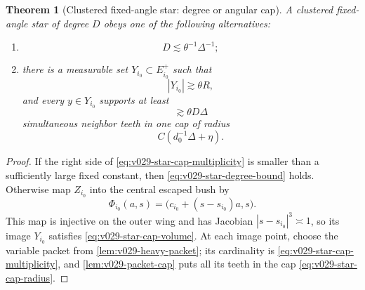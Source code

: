 \documentclass[10pt]{article}
\newtheorem{theorem}{Theorem}[section]
\begin{document}
\begin{theorem}[Clustered fixed-angle star: degree or angular cap]
\label{thm:v029-star-cap}
A clustered fixed-angle star of degree \(D\) obeys one of the following alternatives:
\begin{enumerate}[label=\textnormal{(\roman*)}]
\item
\begin{equation}
\label{eq:v029-star-degree-bound}
\boxed{
D
\lesssim
\theta^{-1}\Delta^{-1};
}
\end{equation}
\item there is a measurable set \(Y_{i_0}\subset E_{i_0}^+\) such that
\begin{equation}
\label{eq:v029-star-cap-volume}
\boxed{
|Y_{i_0}|
\gtrsim
\theta R,
}
\end{equation}
and every \(y\in Y_{i_0}\) supports at least
\begin{equation}
\label{eq:v029-star-cap-multiplicity}
\boxed{
\gtrsim
\theta D\Delta
}
\end{equation}
simultaneous neighbor teeth in one cap of radius
\begin{equation}
\label{eq:v029-star-cap-radius}
\boxed{
C(d_0^{-1}\Delta+\eta).
}
\end{equation}
\end{enumerate}
\end{theorem}

\begin{proof}
If the right side of
\eqref{eq:v029-star-cap-multiplicity} is smaller than a sufficiently large fixed constant, then
\eqref{eq:v029-star-degree-bound} holds.  Otherwise map \(Z_{i_0}\) into the central escaped bush by
\[
\Phi_{i_0}(a,s)
=
\bigl(c_{i_0}+(s-s_{i_0})a,s\bigr).
\]
This map is injective on the outer wing and has Jacobian \(|s-s_{i_0}|^3\asymp1\), so its image
\(Y_{i_0}\) satisfies
\eqref{eq:v029-star-cap-volume}.  At each image point, choose the variable packet from
\cref{lem:v029-heavy-packet}; its cardinality is
\eqref{eq:v029-star-cap-multiplicity}, and
\cref{lem:v029-packet-cap} puts all its teeth in the cap
\eqref{eq:v029-star-cap-radius}.
\end{proof}
\end{document}
